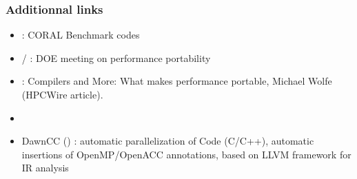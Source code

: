 \begin{frame}
  \frametitle{Additionnal links}

  \begin{itemize}
  \item {} : CORAL Benchmark codes
  \item {} /  : DOE meeting on performance portability
  \item {\small {}} : Compilers and More: What makes performance portable, Michael Wolfe (HPCWire article).
  \item {\small {}}
  \item DawnCC () : automatic parallelization of Code (C/C++), automatic insertions of OpenMP/OpenACC annotations, based on LLVM framework for IR analysis
  \end{itemize}

\end{frame}
